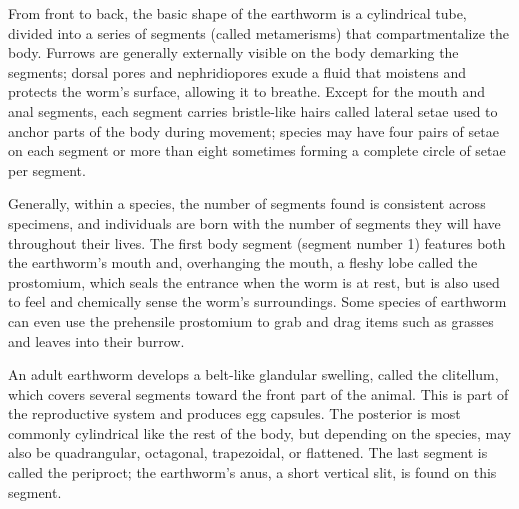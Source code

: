 \documentclass[]{book}
\begin{document}
From front to back, the basic shape of the earthworm is a cylindrical tube, divided into a series of segments (called metamerisms) that compartmentalize the body. Furrows are generally externally visible on the body demarking the segments; dorsal pores and nephridiopores exude a fluid that moistens and protects the worm's surface, allowing it to breathe. Except for the mouth and anal segments, each segment carries bristle-like hairs called lateral setae used to anchor parts of the body during movement; species may have four pairs of setae on each segment or more than eight sometimes forming a complete circle of setae per segment.

Generally, within a species, the number of segments found is consistent across specimens, and individuals are born with the number of segments they will have throughout their lives. The first body segment (segment number 1) features both the earthworm's mouth and, overhanging the mouth, a fleshy lobe called the prostomium, which seals the entrance when the worm is at rest, but is also used to feel and chemically sense the worm's surroundings. Some species of earthworm can even use the prehensile prostomium to grab and drag items such as grasses and leaves into their burrow.

An adult earthworm develops a belt-like glandular swelling, called the clitellum, which covers several segments toward the front part of the animal. This is part of the reproductive system and produces egg capsules. The posterior is most commonly cylindrical like the rest of the body, but depending on the species, may also be quadrangular, octagonal, trapezoidal, or flattened. The last segment is called the periproct; the earthworm's anus, a short vertical slit, is found on this segment.
\end{document}
